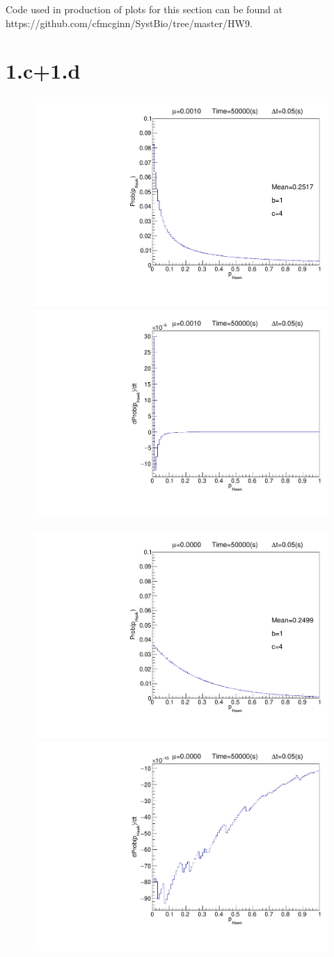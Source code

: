 \documentclass{article}
\begin{document}
Code used in production of plots for this section can be found at https://github.com/cfmcginn/SystBio/tree/master/HW9.
\section{1.c+1.d}

\begin{figure}[H]
    \centering
    \includegraphics[width=.45\textwidth]{hawkDoveProb_Mu0p0010_20171201.pdf} 
    \includegraphics[width=.45\textwidth]{hawkDoveProb_DPDT_Mu0p0010_20171201.pdf} 
    \caption{}
    \label{fig:fig1}
\end{figure}

\begin{figure}[H]
    \centering
    \includegraphics[width=.45\textwidth]{hawkDoveProb_Mu0p0000_20171201.pdf} 
    \includegraphics[width=.45\textwidth]{hawkDoveProb_DPDT_Mu0p0000_20171201.pdf} 
    \caption{}
    \label{fig:fig2}
\end{figure}
\end{document}
